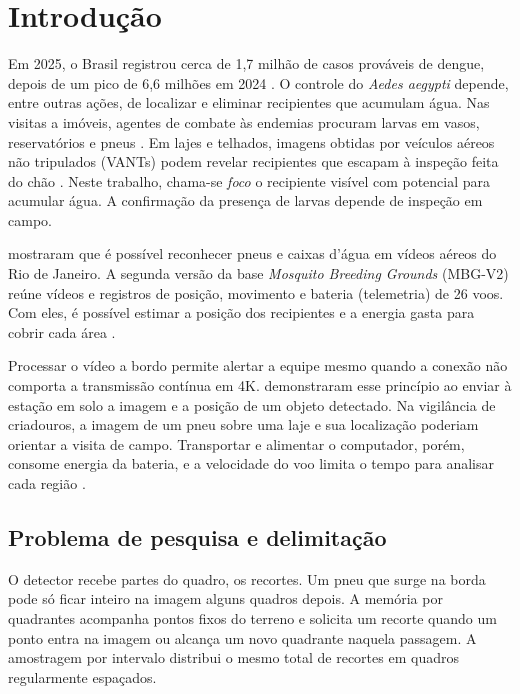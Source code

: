 
\chapter[Introdução]{Introdução}
\label{cap_introducao}

Em 2025, o Brasil registrou cerca de 1,7 milhão de casos prováveis de dengue, depois de um pico de 6,6 milhões em 2024 \cite{brasil2026dengue}. O controle do \textit{Aedes aegypti} depende, entre outras ações, de localizar e eliminar recipientes que acumulam água. Nas visitas a imóveis, agentes de combate às endemias procuram larvas em vasos, reservatórios e pneus \cite{brasil2026liraa,passos2018dissertacao}. Em lajes e telhados, imagens obtidas por veículos aéreos não tripulados (VANTs) podem revelar recipientes que escapam à inspeção feita do chão \cite{hahm2026dar}. Neste trabalho, chama-se \textit{foco} o recipiente visível com potencial para acumular água. A confirmação da presença de larvas depende de inspeção em campo.

 mostraram que é possível reconhecer pneus e caixas d'água em vídeos aéreos do Rio de Janeiro. A segunda versão da base \textit{Mosquito Breeding Grounds} (MBG-V2) reúne vídeos e registros de posição, movimento e bateria (telemetria) de 26 voos. Com eles, é possível estimar a posição dos recipientes e a energia gasta para cobrir cada área \cite{passos2024tese,smt2024mbgv2}.

Processar o vídeo a bordo permite alertar a equipe mesmo quando a conexão não comporta a transmissão contínua em 4K.  demonstraram esse princípio ao enviar à estação em solo a imagem e a posição de um objeto detectado. Na vigilância de criadouros, a imagem de um pneu sobre uma laje e sua localização poderiam orientar a visita de campo. Transportar e alimentar o computador, porém, consome energia da bateria, e a velocidade do voo limita o tempo para analisar cada região \cite{difranco2016coverage,boroujerdian2018mavbench,krishnan2020sky}.

\section{Problema de pesquisa e delimitação}

O detector recebe partes do quadro, os recortes. Um pneu que surge na borda pode só ficar inteiro na imagem alguns quadros depois. A memória por quadrantes acompanha pontos fixos do terreno e solicita um recorte quando um ponto entra na imagem ou alcança um novo quadrante naquela passagem. A amostragem por intervalo distribui o mesmo total de recortes em quadros regularmente espaçados.

